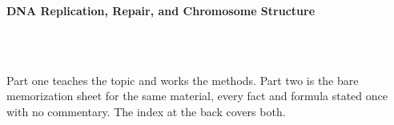 



\makeindex[title={Index of This Volume},columns=2,intoc]

\begin{titlepage}\thispagestyle{empty}
\vspace*{0.14\textheight}
\noindent{\color{tiercore}\rule{\textwidth}{5pt}}\\[3pt]
\noindent{\color{bioline}\rule{\textwidth}{1pt}}\\[26pt]
\\[12pt]
\noindent\begin{minipage}{\textwidth}\raggedright
{\sffamily\bfseries\fontsize{28}{32}\selectfont\color{bioink}%
 \hyphenchar{} DNA Replication, Repair, and Chromosome Structure\par}\end{minipage}\\[16pt]
\noindent{\color{biogreen}\rule{\textwidth}{1.4pt}}\\[10pt]
\noindent\begin{minipage}{\textwidth}\raggedright
{\fontsize{10.5}{14}\selectfont\color{biogreen}%
Part one teaches the topic and works the methods. Part two is the bare memorization sheet for the
same material, every fact and formula stated once with no commentary. The index at the back covers both.\par}\end{minipage}
\vfill
\noindent{\color{bioline}\rule{\textwidth}{1pt}}\\[3pt]
\noindent{\color{tiercore}\rule{\textwidth}{5pt}}
\end{titlepage}
\tableofcontents
\clearpage
{}
\clearpage
\printindex

